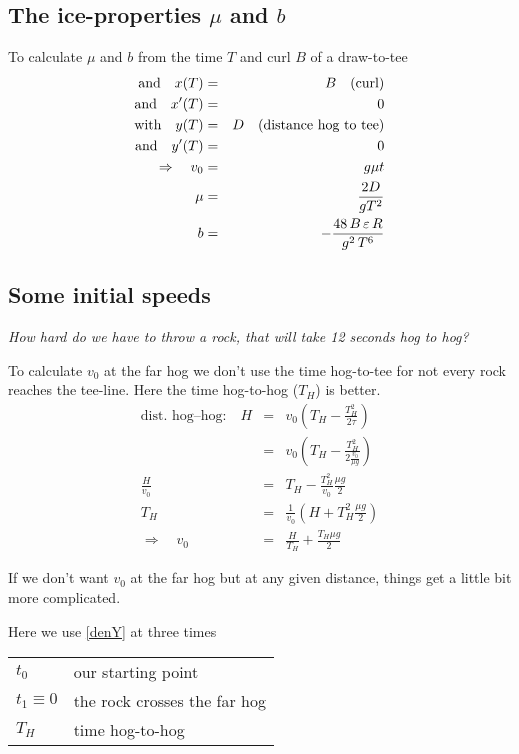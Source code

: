 \subsection{The ice-properties $ \mu $ and $ b $}
To calculate $\mu$ and $b$ from the time $T$ and curl $B$ of a draw-to-tee
\begin{eqnarray}
\eqlab{dennyXTee}
\mbox{and} \quad x(T) &=& B \quad \mbox{(curl)} \\
\mbox{and} \quad x'(T) &=& 0 \\
\eqlab{dennyYTee}
\mbox{with} \quad y(T) &=& D \quad \mbox{(distance hog to tee)} \\
\mbox{and} \quad y'(T) &=& 0 \\
\Rightarrow \quad v_0 &=& g \mu t \\
\eqlab{dennyMu}
\mu &=& \frac{2 D}{g T^2} \\
\eqlab{dennyCurl}
b &=& -{{48\,B\,\varepsilon\,R}\over{g^2\,T^6}}
\end{eqnarray}

\subsection{Some initial speeds}

\textit{How hard do we have to throw a rock, that will take 12 seconds hog to
hog?}

To calculate $v_0$ at the far hog we don't use the time hog-to-tee for not
every rock reaches the tee-line. Here the time hog-to-hog ($T_H$) is better.
\begin{eqnarray}
\mbox{dist.~hog--hog:} \quad H &=& v_0 \left( T_H - \frac{T_H^2}{2\tau}\right) \\
&=& v_0 \left(T_H - \frac{T_H^2}{2 \frac{v_0}{\mu g} }\right) \\
\frac{H}{v_0} &=& T_H - \frac{T_H^2}{v_0} \frac{\mu g}{2} \\
T_H &=& \frac{1}{v_0} \left(H + T_H^2 \frac{\mu g}{2}\right) \\
\Longrightarrow\quad
v_0 &=& \frac{H}{T_H} + \frac{T_H\mu g}{2}
\end{eqnarray}

If we don't want $v_0$ at the far hog but at any given distance, things get a
little bit more complicated.

Here we use \eqref{denY} at three times

\medskip
\begin{tabular}{l@{ : }l}
$t_0          $ & our starting point \\
$t_1 \equiv 0 $ & the rock crosses the far hog \\
$T_H $          & time hog-to-hog
\end{tabular}
\medskip

